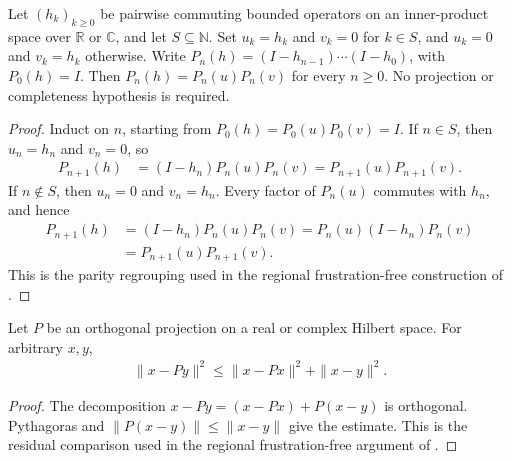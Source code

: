 \begin{theorem}
    \label{thm:complement_product_partition}
    \leanok
    Let $(h_k)_{k\ge0}$ be pairwise commuting bounded operators on an
    inner-product space over $\mathbb R$ or $\mathbb C$, and let $S\subseteq\mathbb N$.
    Set $u_k=h_k$ and $v_k=0$ for $k\in S$, and $u_k=0$ and $v_k=h_k$ otherwise.
    Write $P_n(h)=(I-h_{n-1})\cdots(I-h_0)$, with $P_0(h)=I$.
    Then $P_n(h)=P_n(u)P_n(v)$ for every $n\ge0$.
    No projection or completeness hypothesis is required.
\end{theorem}
\begin{proof}\leanok
    Induct on $n$, starting from $P_0(h)=P_0(u)P_0(v)=I$.
    If $n\in S$, then $u_n=h_n$ and $v_n=0$, so
    \begin{align*}
        P_{n+1}(h) & =(I-h_n)P_n(u)P_n(v)
        =P_{n+1}(u)P_{n+1}(v).
    \end{align*}
    If $n\notin S$, then $u_n=0$ and $v_n=h_n$.
    Every factor of $P_n(u)$ commutes with $h_n$, and hence
    \begin{align*}
        P_{n+1}(h) & =(I-h_n)P_n(u)P_n(v)
        =P_n(u)(I-h_n)P_n(v)                \\
                   & =P_{n+1}(u)P_{n+1}(v).
    \end{align*}
    This is the parity regrouping used in the regional frustration-free
    construction of \cite[Section 6.1]{Arad2016RigorousRG}.
\end{proof}

\begin{theorem}
    \label{thm:projection_perturbed_input_residual}
    \leanok
    Let $P$ be an orthogonal projection on a real or complex Hilbert space.
    For arbitrary $x,y$,
    \begin{align*}
        \|x-Py\|^2\le\|x-Px\|^2+\|x-y\|^2.
    \end{align*}
\end{theorem}
\begin{proof}\leanok
    The decomposition $x-Py=(x-Px)+P(x-y)$ is orthogonal.
    Pythagoras and $\|P(x-y)\|\le\|x-y\|$ give the estimate.
    This is the residual comparison used in the regional frustration-free
    argument of \cite[Section 6.1]{Arad2016RigorousRG}.
\end{proof}
